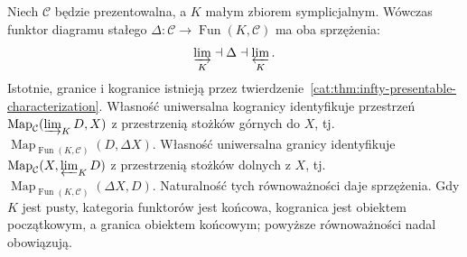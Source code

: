 \begin{przyklad}\label{cat:ex:infty-presentable-constant}
Niech $\mathcal C$ będzie prezentowalna, a $K$ małym zbiorem symplicjalnym. Wówczas funktor diagramu stałego $\Delta:\mathcal C\to\operatorname{Fun}(K,\mathcal C)$ ma oba sprzężenia:
\[
 \varinjlim_K\dashv\Delta\dashv\varprojlim_K.
\]
Istotnie, granice i kogranice istnieją przez twierdzenie~\ref{cat:thm:infty-presentable-characterization}. Własność uniwersalna kogranicy identyfikuje przestrzeń $\operatorname{Map}_{\mathcal C}(\varinjlim_K D,X)$ z przestrzenią stożków górnych do $X$, tj. $\operatorname{Map}_{\operatorname{Fun}(K,\mathcal C)}(D,\Delta X)$. Własność uniwersalna granicy identyfikuje $\operatorname{Map}_{\mathcal C}(X,\varprojlim_K D)$ z przestrzenią stożków dolnych z $X$, tj. $\operatorname{Map}_{\operatorname{Fun}(K,\mathcal C)}(\Delta X,D)$. Naturalność tych równoważności daje sprzężenia. Gdy $K$ jest pusty, kategoria funktorów jest końcowa, kogranica jest obiektem początkowym, a granica obiektem końcowym; powyższe równoważności nadal obowiązują.
\end{przyklad}

